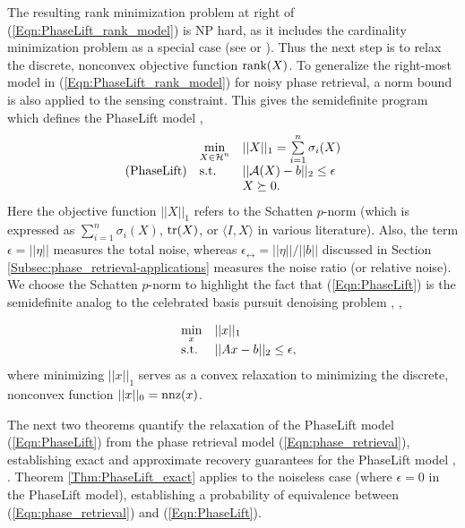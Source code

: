The resulting rank minimization problem at right of (\ref{Eqn:PhaseLift_rank_model}) is NP hard, as it includes the cardinality minimization problem as a special case (see \cite{natarajan1995sparse} or  \cite{recht2010guaranteed}).  Thus the next step is to relax the discrete, nonconvex objective function $\textnormal{rank}(X)$.  To generalize the right-most model in (\ref{Eqn:PhaseLift_rank_model}) for noisy phase retrieval, a norm bound is also applied to the sensing constraint.  This gives the semidefinite program which defines the PhaseLift model \cite{DBLP:journals/siamis/CandesESV13}, \cite{candes2013phaselift}
\begin{equation} \label{Eqn:PhaseLift}
\begin{array}{lll}
	&	\min\limits_{\substack{X \in {\mathcal H}^n}}
		&	||X||_1 = \sum\limits_{\substack{i=1}}^{\substack{n}} \sigma_i(X)
			\\
\textnormal{(PhaseLift)}
	&	\textnormal{s.t.}
		& 	||{\mathcal A} (X) - b||_2 \leq \epsilon
			\\

	&
		&	X \succeq 0.

\end{array}
\end{equation}
Here the objective function $||X||_1$ refers to the Schatten $p$-norm (which is expressed as $\sum_{i=1}^n \sigma_i(X)$, $\mathrm{tr}(X)$, or $\langle I, X \rangle$ in various literature).  Also, the term $\epsilon = ||\eta||$ measures the total noise, whereas $\epsilon_\rel = ||\eta|| / ||b||$ discussed in Section \ref{Subsec:phase_retrieval-applications} measures the noise ratio (or relative noise).  We choose the Schatten $p$-norm to highlight the fact that (\ref{Eqn:PhaseLift}) is the semidefinite analog to the celebrated  basis pursuit denoising problem \cite{chen2001atomic}, \cite{candes2006stable},

\begin{equation}  			\label{Eqn:basis_pursuit}
\begin{array}{lll}
	&	\min\limits_{\substack{x}}
		&	||x||_1
			\\
	&	\textnormal{s.t.}
		&	||Ax-b||_2 \leq \epsilon,
\end{array}
\end{equation}
where minimizing $||x||_1$ serves as a convex relaxation to minimizing the discrete, nonconvex function $||x||_0 = \textnormal{nnz}(x)$.



The next two theorems quantify the relaxation of the PhaseLift model (\ref{Eqn:PhaseLift}) from the phase retrieval model (\ref{Eqn:phase_retrieval}), establishing exact and approximate recovery guarantees for the PhaseLift model \cite{candes2014solving}, \cite{candes2013phaselift}.  Theorem \ref{Thm:PhaseLift_exact} applies to the noiseless case (where $\epsilon = 0$ in the PhaseLift model), establishing a probability of equivalence between (\ref{Eqn:phase_retrieval}) and (\ref{Eqn:PhaseLift}).  


